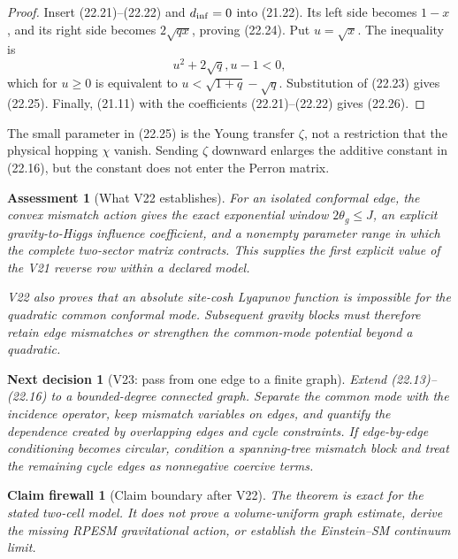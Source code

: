 \documentclass[11pt]{article}
\newtheorem{firewall}[theorem]{Claim firewall}
\newtheorem{decision}[theorem]{Next decision}
\newtheorem{assessment}[theorem]{Assessment}
\theoremstyle{remark}
\begin{document}
\begin{proof}
Insert (22.21)--(22.22) and \(d_{\rm inf}=0\) into (21.22).  Its left
side becomes \(1-x\), and its right side becomes
\(2\sqrt{qx}\), proving (22.24).  Put \(u=\sqrt{x}\).  The inequality
is
\[
 u^2+2\sqrt q,u-1<0,                              \tag{22.27}
\]
which for \(u\geq0\) is equivalent to
\(u<\sqrt{1+q}-\sqrt q\).  Substitution of (22.23) gives (22.25).
Finally, (21.11) with the coefficients (22.21)--(22.22) gives
(22.26).
\end{proof}

The small parameter in (22.25) is the Young transfer \(\zeta\), not a
restriction that the physical hopping \(\chi\) vanish.  Sending
\(\zeta\) downward enlarges the additive constant in (22.16), but the
constant does not enter the Perron matrix.

\begin{assessment}[What V22 establishes]
\label{ass:v17v22-status}
For an isolated conformal edge, the convex mismatch action gives the
exact exponential window \(2\theta_g\leq J\), an explicit
gravity-to-Higgs influence coefficient, and a nonempty parameter range
in which the complete two-sector matrix contracts.  This supplies the
first explicit value of the V21 reverse row within a declared model.

V22 also proves that an absolute site-cosh Lyapunov function is
impossible for the quadratic common conformal mode.  Subsequent gravity
blocks must therefore retain edge mismatches or strengthen the
common-mode potential beyond a quadratic.
\end{assessment}

\begin{decision}[V23: pass from one edge to a finite graph]
\label{dec:v17v22-next}
Extend (22.13)--(22.16) to a bounded-degree connected graph.  Separate
the common mode with the incidence operator, keep mismatch variables on
edges, and quantify the dependence created by overlapping edges and
cycle constraints.  If edge-by-edge conditioning becomes circular,
condition a spanning-tree mismatch block and treat the remaining cycle
edges as nonnegative coercive terms.
\end{decision}

\begin{firewall}[Claim boundary after V22]
\label{fire:v17v22}
The theorem is exact for the stated two-cell model.  It does not prove a
volume-uniform graph estimate, derive the missing RPESM gravitational
action, or establish the Einstein--SM continuum limit.
\end{firewall}
\end{document}
